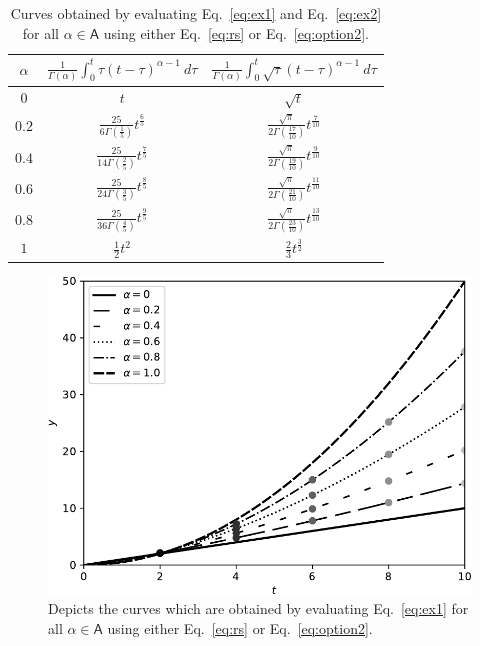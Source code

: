 \documentclass{article}
\theoremstyle{theorem}
\theoremstyle{definition}
\begin{document}
\begin{table}[h!]
\centering
\caption{Curves obtained by evaluating Eq.~\eqref{eq:ex1} and Eq.~\eqref{eq:ex2} for all $\alpha\in \mathsf{A}$ using either Eq.~\eqref{eq:rs} or Eq.~\eqref{eq:option2}.}
\label{tab:eval}
\begin{tabular}{||c|| c| c||} 
 \hline
 $\alpha$ & $\frac{1}{\Gamma(\alpha)}\int_0^t \tau(t-\tau)^{\alpha-1}~d\tau$ & $\frac{1}{\Gamma(\alpha)}\int_0^t \sqrt{\tau}(t-\tau)^{\alpha-1}~d\tau$ \\[0.5ex]
 \hline\hline
 \rule{0pt}{2.5ex}
 $0$ & $t$ & $\sqrt{t}$  \\  
 \rule{0pt}{2.5ex}
 $0.2$ & $\frac{25}{6\Gamma(\frac{1}{5})} t^{\frac{6}{5}}$  & $\frac{\sqrt{\pi}}{2\Gamma(\frac{17}{10})} t^{\frac{7}{10}}$  \\ 
 \rule{0pt}{2.5ex}
 $0.4$ & $\frac{25}{14\Gamma(\frac{2}{5})} t^{\frac{7}{5}}$  & $\frac{\sqrt{\pi}}{2\Gamma(\frac{19}{10})} t^{\frac{9}{10}}$  \\
 \rule{0pt}{2.5ex}
 $0.6$ & $\frac{25}{24\Gamma(\frac{3}{5})} t^{\frac{8}{5}}$  & $\frac{\sqrt{\pi}}{2\Gamma(\frac{21}{10})} t^{\frac{11}{10}}$  \\ 
 \rule{0pt}{2.5ex}
 $0.8$ & $\frac{25}{36\Gamma(\frac{4}{5})} t^{\frac{9}{5}}$  & $\frac{\sqrt{\pi}}{2\Gamma(\frac{23}{10})} t^{\frac{13}{10}}$  \\ 
 \rule{0pt}{2.5ex}
 $1$ & $\frac{1}{2}t^2$  & $\frac{2}{3}t^{\frac{3}{2}}$  \\ [1ex]
 \hline
 \end{tabular}
\end{table}

\begin{figure}[htb]
\centering
\includegraphics[width=1\textwidth]{func_eval1.pdf}
\caption{Depicts the curves which are obtained by evaluating Eq.~\eqref{eq:ex1} for all $\alpha\in \mathsf{A}$ using either Eq.~\eqref{eq:rs} or Eq.~\eqref{eq:option2}.}
\label{fig:eval1}
\end{figure}
\end{document}
